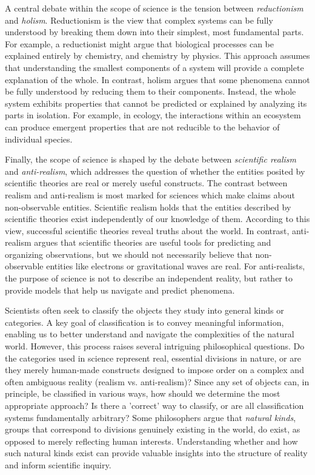 
A central debate within the scope of science is the tension between \emph{reductionism} and \emph{holism}. Reductionism is the view that complex systems can be fully understood by breaking them down into their simplest, most fundamental parts. For example, a reductionist might argue that biological processes can be explained entirely by chemistry, and chemistry by physics. This approach assumes that understanding the smallest components of a system will provide a complete explanation of the whole. In contrast, holism argues that some phenomena cannot be fully understood by reducing them to their components. Instead, the whole system exhibits properties that cannot be predicted or explained by analyzing its parts in isolation. For example, in ecology, the interactions within an ecosystem can produce emergent properties that are not reducible to the behavior of individual species.

Finally, the scope of science is shaped by the debate between \emph{scientific realism} and \emph{anti-realism}, which addresses the question of whether the entities posited by scientific theories are real or merely useful constructs. The contrast between realism and anti-realism is most marked for sciences which make claims about non-observable entities. Scientific realism holds that the entities described by scientific theories exist independently of our knowledge of them. According to this view, successful scientific theories reveal truths about the world. In contrast, anti-realism argues that scientific theories are useful tools for predicting and organizing observations, but we should not necessarily believe that non-observable entities like electrons or gravitational waves are real. For anti-realists, the purpose of science is not to describe an independent reality, but rather to provide models that help us navigate and predict phenomena.

Scientists often seek to classify the objects they study into general kinds or categories. A key goal of classification is to convey meaningful information, enabling us to better understand and navigate the complexities of the natural world. However, this process raises several intriguing philosophical questions. Do the categories used in science represent real, essential divisions in nature, or are they merely human-made constructs designed to impose order on a complex and often ambiguous reality (realism vs. anti-realism)? Since any set of objects can, in principle, be classified in various ways, how should we determine the most appropriate approach? Is there a 'correct' way to classify, or are all classification systems fundamentally arbitrary? Some philosophers argue that \emph{natural kinds}, groups that correspond to divisions genuinely existing in the world, do exist, as opposed to merely reflecting human interests. Understanding whether and how such natural kinds exist can provide valuable insights into the structure of reality and inform scientific inquiry.

